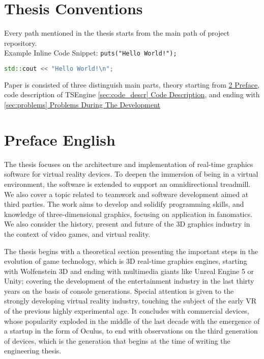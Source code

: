 \newpage
\section{Thesis Conventions}
Every path mentioned in the thesis starts from the main path of project repository.\\
Example Inline Code Snippet: \texttt{puts("Hello World!");}
\\
\begin{lstlisting}[language=c++, caption=Example Code Snippet(./example\_dir/example\_file.cpp)]
std::cout << "Hello World!\n";
\end{lstlisting}
Paper is consisted of three distinguish main parts, theory starting from \hyperref[sec:preface]{\ref*{sec:preface} Preface}, code description of TSEngine \hyperref[sec:code_descr]{\ref*{sec:code_descr} Code Description}, and ending with \hyperref[sec:problems]{\ref*{sec:problems} Problems During The Development}

\newpage
\section{Preface English} %
\label{sec:preface}
The thesis focuses on the architecture and implementation of real-time graphics software for virtual reality devices. To deepen the immersion of being in a virtual environment, the software is extended to support an omnidirectional treadmill. We also cover a topic related to teamwork and software development aimed at third parties. The work aims to develop and solidify programming skills, and knowledge of three-dimensional graphics, focusing on application in fanomatics. We also consider the history, present and future of the 3D graphics industry in the context of video games, and virtual reality.

The thesis begins with a theoretical section presenting the important steps in the evolution of game technology, which is 3D real-time graphics engines, starting with Wolfenstein 3D and ending with multimedia giants like Unreal Engine 5 or Unity; covering the development of the entertainment industry in the last thirty years on the basis of console generations. Special attention is given to the strongly developing virtual reality industry, touching the subject of the early VR of the previous highly experimental age. It concludes with commercial devices, whose popularity exploded in the middle of the last decade with the emergence of a startup in the form of Oculus, to end with observations on the third generation of devices, which is the generation that begins at the time of writing the engineering thesis.

